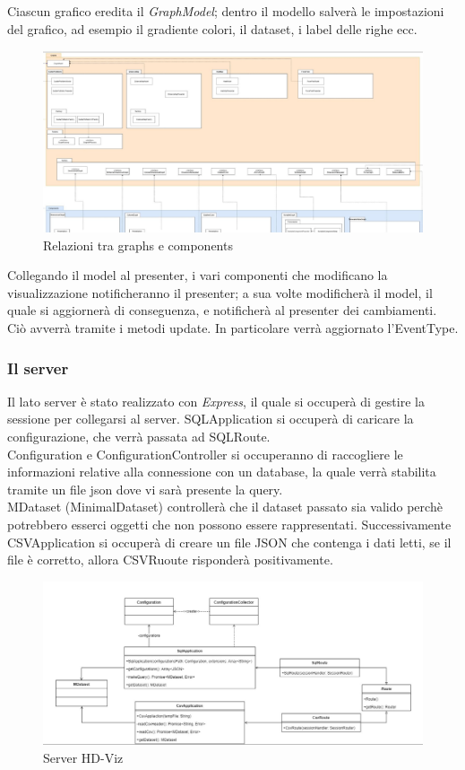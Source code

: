 \documentclass[../manuale_sviluppatore.tex]{subfiles}
\begin{document}
Ciascun grafico eredita il \emph{GraphModel}; dentro il modello salverà le impostazioni del grafico, ad esempio il gradiente colori, il dataset, i label delle righe ecc.

\begin{figure}[H]
	\centering
	\includegraphics[width=18cm]{img/graphs-e-components.jpg}
	\caption{Relazioni tra graphs e components}
\end{figure}


Collegando il model al presenter, i vari componenti che modificano la visualizzazione notificheranno il presenter; a sua volte modificherà il model, il quale si aggiornerà di conseguenza, 
e notificherà al presenter dei cambiamenti.
Ciò avverrà tramite i metodi update. In particolare verrà aggiornato l'EventType.

\subsubsection{Il server}

Il lato server è stato realizzato con \emph{Express}, il quale si occuperà di gestire la sessione per collegarsi al server.
SQLApplication si occuperà di caricare la configurazione, che verrà passata ad SQLRoute.\\
Configuration e ConfigurationController si occuperanno di raccogliere le informazioni relative alla connessione con un database, la quale verrà stabilita tramite un file
json dove vi sarà presente la query.\\
MDataset (MinimalDataset) controllerà che il dataset passato sia valido perchè potrebbero esserci oggetti che non possono essere rappresentati. Successivamente
CSVApplication si occuperà di creare un file JSON che contenga i dati letti, se il file è corretto, allora CSVRuoute risponderà positivamente.

\begin{figure}[H]
	\centering
	\includegraphics[width=18cm]{img/server.jpg}
	\caption{Server HD-Viz}
\end{figure}
\end{document}
